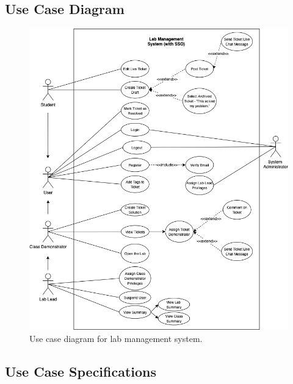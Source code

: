 \subsection{Use Case Diagram}

\begin{figure}[H]
    \centering
    \includegraphics[width=\textwidth]{5design/images/useCase.png}
    \caption{Use case diagram for lab management system.}
    \label{fig:useCase}
\end{figure}

\subsection{Use Case Specifications}

